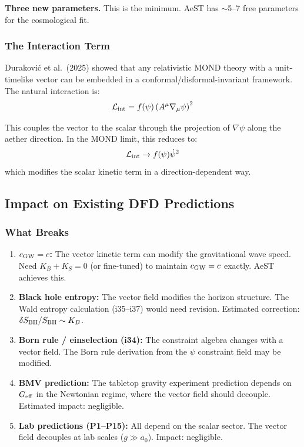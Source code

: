 \documentclass[11pt,a4paper]{article}
\begin{document}
\textbf{Three new parameters.} This is the minimum. AeST has $\sim$5--7 free parameters for the cosmological fit.

\subsubsection{The Interaction Term}

Durakovi\'{c} et al.\ (2025) showed that any relativistic MOND theory with a unit-timelike vector can be embedded in a conformal/disformal-invariant framework. The natural interaction is:
\begin{equation}
\mathcal{L}_{\rm int} = f(\psi)\left(A^\mu\nabla_\mu\psi\right)^2
\end{equation}

This couples the vector to the scalar through the projection of $\nabla\psi$ along the aether direction. In the MOND limit, this reduces to:
\begin{equation}
\mathcal{L}_{\rm int} \to f(\psi)\dot{\psi}^2
\end{equation}
which modifies the scalar kinetic term in a direction-dependent way.

\subsection{Impact on Existing DFD Predictions}

\subsubsection{What Breaks}

\begin{enumerate}
\item \textbf{$c_{\rm GW} = c$:} The vector kinetic term can modify the gravitational wave speed. Need $K_B + K_S = 0$ (or fine-tuned) to maintain $c_{\rm GW} = c$ exactly. AeST achieves this.

\item \textbf{Black hole entropy:} The vector field modifies the horizon structure. The Wald entropy calculation (i35--i37) would need revision. Estimated correction: $\delta S_{\rm BH}/S_{\rm BH} \sim K_B$.

\item \textbf{Born rule / einselection (i34):} The constraint algebra changes with a vector field. The Born rule derivation from the $\psi$ constraint field may be modified.

\item \textbf{BMV prediction:} The tabletop gravity experiment prediction depends on $G_{\rm eff}$ in the Newtonian regime, where the vector field should decouple. Estimated impact: negligible.

\item \textbf{Lab predictions (P1--P15):} All depend on the scalar sector. The vector field decouples at lab scales ($g \gg a_0$). Impact: negligible.
\end{enumerate}
\end{document}
